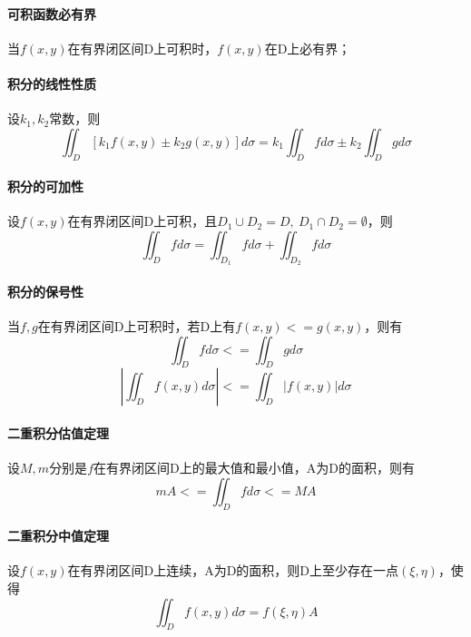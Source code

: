\paragraph{可积函数必有界}
当\(f(x, y)\)在有界闭区间D上可积时，\(f(x, y)\)在D上必有界；

\paragraph{积分的线性性质}
设\(k_1, k_2\)常数，则\[\iint_D[k_1f(x, y) \pm k_2g(x, y)]d\sigma = k_1\iint_Dfd\sigma \pm k_2\iint_Dgd\sigma\]

\paragraph{积分的可加性}
设\(f(x, y)\)在有界闭区间D上可积，且\(D_1\cup D_2 = D,\ D_1 \cap D_2 = \emptyset\)，则
\[\iint_Dfd\sigma = \iint_{D_1}fd\sigma + \iint_{D_2}fd\sigma\]

\paragraph{积分的保号性}
当\(f, g\)在有界闭区间D上可积时，若D上有\(f(x, y) <= g(x, y)\)，则有\[\iint_Dfd\sigma <= \iint_Dgd\sigma\]
\[|\iint_Df(x, y)d\sigma| <= \iint_D|f(x, y)|d\sigma\]

\paragraph{二重积分估值定理}
设\(M, m\)分别是\(f\)在有界闭区间D上的最大值和最小值，A为D的面积，则有
\[mA <= \iint_Dfd\sigma <= MA\]

\paragraph{二重积分中值定理}
设\(f(x, y)\)在有界闭区间D上连续，A为D的面积，则D上至少存在一点\((\xi, \eta)\)，使得
\[\iint_Df(x, y)d\sigma = f(\xi, \eta)A\]



